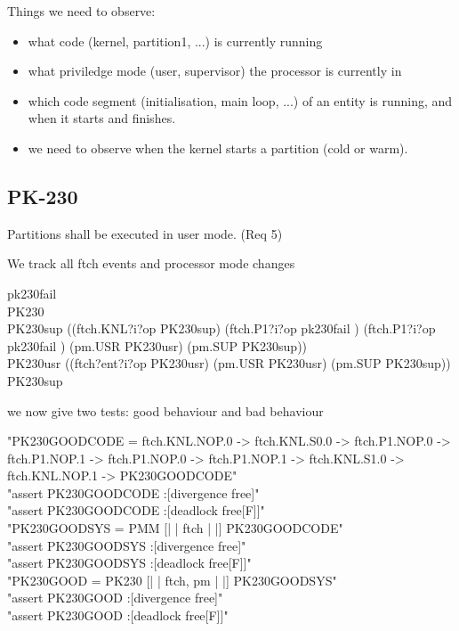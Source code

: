 Things we need to observe:
\begin{itemize}
  \item what code (kernel, partition1, ...) is currently running
  \item what priviledge mode (user, supervisor) the processor is currently in
  \item which code segment (initialisation, main loop, ...) of an entity is running, and when it starts and finishes.
  \item we need to observe when the kernel starts a partition (cold or warm).
\end{itemize}

\subsection{PK-230}
Partitions shall be executed in user mode. (Req 5)

We track all ftch events and processor mode changes

\begin{circus}
\circchannel pk230fail\\

\circprocess PK230 \circdef \circbegin\\

PK230sup
 \circdef ((ftch.KNL?i?op \then PK230sup)
    \extchoice
    (ftch.P1?i?op \then pk230fail \then \Stop)
    \extchoice
    (ftch.P1?i?op \then pk230fail \then \Stop)
    \extchoice
    (pm.USR \then PK230usr)
    \extchoice
    (pm.SUP \then PK230sup))\\

PK230usr
 \circdef ((ftch?ent?i?op \then PK230usr)
    \extchoice
    (pm.USR \then PK230usr)
    \extchoice
    (pm.SUP \then PK230sup))\\
\circspot  PK230sup %
\circend
\end{circus}
we now give two tests: good behaviour and bad behaviour

\begin{assert}
"PK230GOODCODE = ftch.KNL.NOP.0 -> ftch.KNL.S0.0 -> ftch.P1.NOP.0 -> ftch.P1.NOP.1 -> ftch.P1.NOP.0 -> ftch.P1.NOP.1 -> ftch.KNL.S1.0 -> ftch.KNL.NOP.1 -> PK230GOODCODE"\\


\also "assert PK230GOODCODE :[divergence free]"\\
\also "assert PK230GOODCODE :[deadlock free[F]]"\\

\also "PK230GOODSYS = PMM [| {| ftch |} |] PK230GOODCODE"\\

\also "assert PK230GOODSYS :[divergence free]"\\
\also "assert PK230GOODSYS :[deadlock free[F]]"\\

\also "PK230GOOD = PK230 [| {| ftch, pm |} |] PK230GOODSYS"\\

\also "assert PK230GOOD :[divergence free]"\\
\also "assert PK230GOOD :[deadlock free[F]]"\\
\end{assert}

